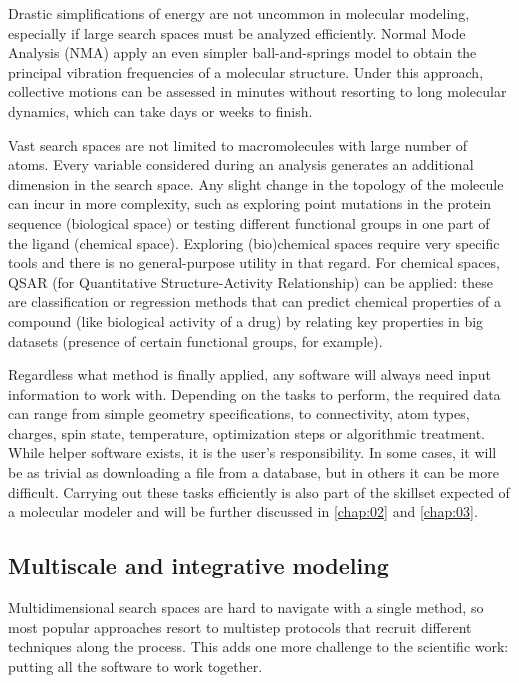 Drastic simplifications of energy are not uncommon in molecular modeling, especially if large search spaces must be analyzed efficiently. Normal Mode Analysis (NMA) apply an even simpler ball-and-springs model to obtain the principal vibration frequencies of a molecular structure. Under this approach, collective motions can be assessed in minutes without resorting to long molecular dynamics, which can take days or weeks to finish.

Vast search spaces are not limited to macromolecules with large number of atoms. Every variable considered during an analysis generates an additional dimension in the search space. Any slight change in the topology of the molecule can incur in more complexity, such as exploring point mutations in the protein sequence (biological space) or testing different functional groups in one part of the ligand (chemical space). Exploring (bio)chemical spaces require very specific tools and there is no general-purpose utility in that regard. For chemical spaces, QSAR (for Quantitative Structure-Activity Relationship) can be applied: these are classification or regression methods that can predict chemical properties of a compound (like biological activity of a drug) by relating key properties in big datasets (presence of certain functional groups, for example).

Regardless what method is finally applied, any software will always need input information to work with. Depending on the tasks to perform, the required data can range from simple geometry specifications, to connectivity, atom types, charges, spin state, temperature, optimization steps or algorithmic treatment. While helper software exists, it is the user’s responsibility. In some cases, it will be as trivial as downloading a file from a database, but in others it can be more difficult. Carrying out these tasks efficiently is also part of the skillset expected of a molecular modeler and will be further discussed in \autoref{chap:02} and \autoref{chap:03}.

\subsection{Multiscale and integrative modeling}
Multidimensional search spaces are hard to navigate with a single method, so most popular approaches resort to multistep protocols that recruit different techniques along the process. This adds one more challenge to the scientific work: putting all the software to work together.

